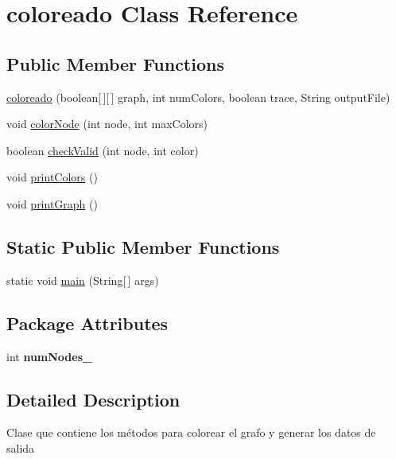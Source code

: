 \hypertarget{classcoloreado}{\section{coloreado \-Class \-Reference}
\label{d5/d4c/classcoloreado}
}
\subsection*{\-Public \-Member \-Functions}
\begin{DoxyCompactItemize}
\item 
\hyperlink{classcoloreado_af63698cc2cfe6b813473199221baeeec}{coloreado} (boolean\mbox{[}$\,$\mbox{]}\mbox{[}$\,$\mbox{]} graph, int num\-Colors, boolean trace, \-String output\-File)
\item 
void \hyperlink{classcoloreado_a7117ad010bc6cb9b592d00cbbd8b8977}{color\-Node} (int node, int max\-Colors)
\item 
boolean \hyperlink{classcoloreado_acd263f80e8310e80f61a43e3c4a40cb3}{check\-Valid} (int node, int color)
\item 
void \hyperlink{classcoloreado_a0ab45c00fcf1741918e4b0d2e8d487d9}{print\-Colors} ()
\item 
void \hyperlink{classcoloreado_a2c76a54d3256e21e5b2512439b55fb4f}{print\-Graph} ()
\end{DoxyCompactItemize}
\subsection*{\-Static \-Public \-Member \-Functions}
\begin{DoxyCompactItemize}
\item 
static void \hyperlink{classcoloreado_a3faec805903e83d479bac047451e52c4}{main} (\-String\mbox{[}$\,$\mbox{]} args)
\end{DoxyCompactItemize}
\subsection*{\-Package \-Attributes}
\begin{DoxyCompactItemize}
\item 
\hypertarget{classcoloreado_a7656ce22bf1511f70455dd86f3f73f38}{int {\bfseries num\-Nodes\-\_\-}}\label{d5/d4c/classcoloreado_a7656ce22bf1511f70455dd86f3f73f38}

\end{DoxyCompactItemize}


\subsection{\-Detailed \-Description}
\-Clase que contiene los métodos para colorear el grafo y generar los datos de salida 

